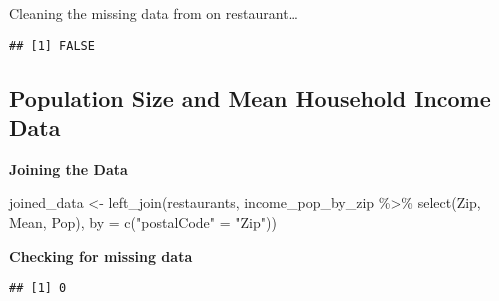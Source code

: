 \documentclass[
]{article}
\newenvironment{Shaded}{\begin{snugshade}}{\end{snugshade}}
\newcommand{\AttributeTok}[1]{\textcolor[rgb]{0.77,0.63,0.00}{#1}}
\newcommand{\CommentTok}[1]{\textcolor[rgb]{0.56,0.35,0.01}{\textit{#1}}}
\newcommand{\DecValTok}[1]{\textcolor[rgb]{0.00,0.00,0.81}{#1}}
\newcommand{\FunctionTok}[1]{\textcolor[rgb]{0.00,0.00,0.00}{#1}}
\newcommand{\NormalTok}[1]{#1}
\newcommand{\OtherTok}[1]{\textcolor[rgb]{0.56,0.35,0.01}{#1}}
\newcommand{\SpecialCharTok}[1]{\textcolor[rgb]{0.00,0.00,0.00}{#1}}
\newcommand{\StringTok}[1]{\textcolor[rgb]{0.31,0.60,0.02}{#1}}
\begin{document}
Cleaning the missing data from on restaurant\ldots{}

\begin{Shaded}
\end{Shaded}

\begin{verbatim}
## [1] FALSE
\end{verbatim}

\hypertarget{population-size-and-mean-household-income-data}{%
\subsection{Population Size and Mean Household Income
Data}\label{population-size-and-mean-household-income-data}}

\textbf{Joining the Data}

\begin{Shaded}
\begin{Highlighting}[]
\NormalTok{joined\_data }\OtherTok{\textless{}{-}} \FunctionTok{left\_join}\NormalTok{(restaurants, income\_pop\_by\_zip }\SpecialCharTok{\%\textgreater{}\%} \FunctionTok{select}\NormalTok{(Zip, Mean, Pop), }\AttributeTok{by =} \FunctionTok{c}\NormalTok{(}\StringTok{"postalCode"} \OtherTok{=} \StringTok{"Zip"}\NormalTok{))}
\end{Highlighting}
\end{Shaded}

\textbf{Checking for missing data}

\begin{Shaded}
\end{Shaded}

\begin{verbatim}
## [1] 0
\end{verbatim}
\end{document}
